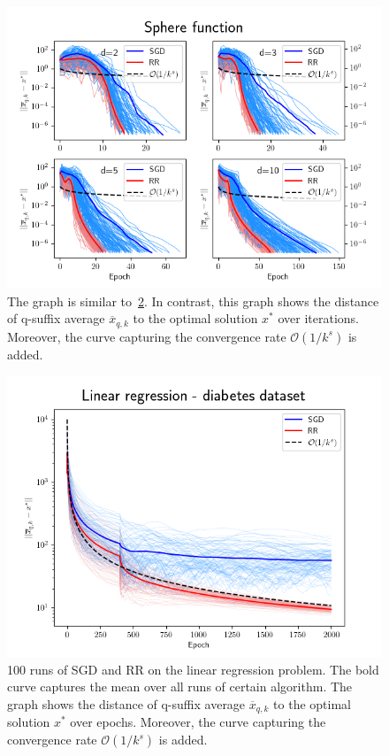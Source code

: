 \documentclass[10pt,conference,compsocconf]{IEEEtran}
\begin{document}
\begin{figure}
  \centering
  \includegraphics[width=\columnwidth]{sphere_runs_average}
  \caption{The graph is similar to~\ref{fig:sphere1}.
  In contrast, this graph shows the distance of q-suffix average
  $\overline{x}_{q,k}$ to the optimal solution $x^*$ over iterations.
  Moreover, the curve capturing the convergence rate
  $\mathcal{O}(1 / k^s)$ is added.}
  \vspace{-3mm}
  \label{fig:denoise-fourier}
\end{figure}

\begin{figure}
  \centering
  \includegraphics[width=\columnwidth]{regression_runs_a}
  \caption{100 runs of SGD and RR on the linear regression problem.
   The bold curve captures the mean over all runs of certain algorithm.
   The graph shows the distance of q-suffix average
   $\overline{x}_{q,k}$ to the optimal solution $x^*$ over
   epochs. Moreover, the curve capturing the convergence rate
   $\mathcal{O}(1 / k^s)$ is added.}
  \vspace{-3mm}
  \label{fig:sphere1}
\end{figure}
\end{document}
